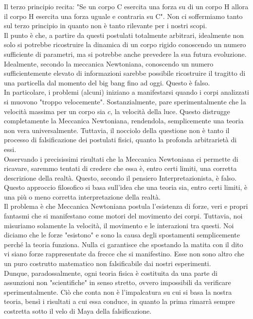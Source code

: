 \documentclass[]{scrbook}
\begin{document}
	Il terzo principio recita: "Se un corpo C esercita una forza su di un corpo H allora il corpo H esercita una forza uguale e contraria su C". Non ci soffermiamo tanto sul terzo principio in quanto non è tanto rilevante per i nostri scopi.\\
	Il punto è che, a partire da questi postulati totalmente arbitrari, idealmente non solo si potrebbe ricostruire la dinamica di un corpo rigido conoscendo un numero sufficiente di parametri, ma si potrebbe anche prevedere la sua futura evoluzione. Idealmente, secondo la meccanica Newtoniana, conoscendo un numero sufficientemente elevato di informazioni sarebbe possibile ricostruire il tragitto di una particella dal momento del big bang fino ad oggi. Questo è falso. \\
	In particolare, i problemi (alcuni) iniziano a manifestarsi quando i corpi analizzati si muovono "troppo velocemente". Sostanzialmente, pare sperimentalmente che la velocità massima per un corpo sia $c$, la velocità della luce. Questo distrugge completamente la Meccanica Newtoniana, rendendola, semplicemente una teoria non vera universalmente. Tuttavia, il nocciolo della questione non è tanto il processo di falsificazione dei postulati fisici, quanto la profonda arbitrarietà di essi.\\
	Osservando i precisissimi risultati che la Meccanica Newtoniana ci permette di ricavare, saremmo tentati di credere che essa è, entro certi limiti, una corretta descrizione della realtà. Questo, secondo il pensiero Interpretazionista, è falso. Questo approccio filosofico si basa sull'idea che una teoria sia, entro certi limiti, è una più o meno corretta interpretazione della realtà. 
	\\
	Il problema è che Meccanica Newtoniana postula l'esistenza di forze, veri e propri fantasmi che si manifestano come motori del movimento dei corpi. Tuttavia, noi misuriamo solamente la velocità, il movimento e le interazioni tra questi. Noi diciamo che le forze "esistono" e sono la causa degli spostamenti semplicemente perché la teoria funziona. Nulla ci garantisce che spostando la matita con il dito vi siano forze rappresentate da frecce che si manifestino. Esse non sono altro che un puro costrutto matematico non falsificabile dai nostri esperimenti.\\
	Dunque, paradossalmente, ogni teoria fisica è costituita da una parte di assunzioni non "scientifiche" in senso stretto, ovvero impossibili da verificare sperimentalmente. Ciò che conta non è l'impalcatura su cui si basa la nostra teoria, bensì i risultati a cui essa conduce, in quanto la prima rimarrà sempre costretta sotto il velo di Maya della falsificazione.\\
\end{document}
